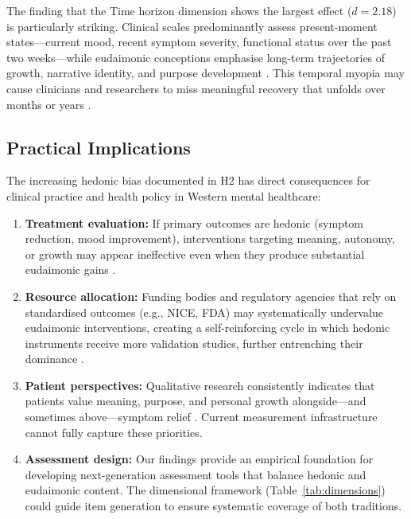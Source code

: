 \documentclass[12pt,a4paper]{article}
\begin{document}
The finding that the Time horizon dimension shows the largest effect ($d = 2.18$) is particularly striking.
Clinical scales predominantly assess present-moment states---current mood, recent symptom severity, functional status over the past two weeks---while eudaimonic conceptions emphasise long-term trajectories of growth, narrative identity, and purpose development
\citep{mcadams2001psychology, king2004benefit}.
This temporal myopia may cause clinicians and researchers to miss meaningful recovery that unfolds over months or years
\citep{tedeschi2004posttraumatic}.

\subsection{Practical Implications}

The increasing hedonic bias documented in H2 has direct consequences for clinical practice and health policy in Western mental healthcare:

\begin{enumerate}
    \item \textbf{Treatment evaluation:} If primary outcomes are hedonic (symptom reduction, mood improvement), interventions targeting meaning, autonomy, or growth may appear ineffective even when they produce substantial eudaimonic gains
    \citep{seligman2005positive, sin2009enhancing, wong2011what}.
    
    \item \textbf{Resource allocation:} Funding bodies and regulatory agencies that rely on standardised outcomes (e.g., NICE, FDA) may systematically undervalue eudaimonic interventions, creating a self-reinforcing cycle in which hedonic instruments receive more validation studies, further entrenching their dominance
    \citep{vittersø2016handbook}.
    
    \item \textbf{Patient perspectives:} Qualitative research consistently indicates that patients value meaning, purpose, and personal growth alongside---and sometimes above---symptom relief
    \citep{slade2010mental, davidson2008recovery}.
    Current measurement infrastructure cannot fully capture these priorities.
    
    \item \textbf{Assessment design:} Our findings provide an empirical foundation for developing next-generation assessment tools that balance hedonic and eudaimonic content.
    The dimensional framework (Table~\ref{tab:dimensions}) could guide item generation to ensure systematic coverage of both traditions.
\end{enumerate}
\end{document}
